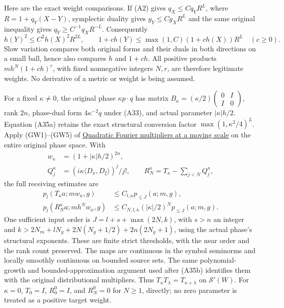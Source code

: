 \documentclass[
  11pt,
]{article}
\begin{document}
Here are the exact weight comparisons. If (A2) gives \(q_X\le Cq_YR^L\),
where \(R=1+q_Y(X-Y)\), symplectic duality gives \(g_Y\le Cg_XR^L\) and
the same original inequality gives \(q_Y\ge C^{-1}q_XR^{-L}\).
Consequently \[
h(Y)^2\le C^2h(X)^2R^{2L},\qquad
1+c h(Y)\le\max(1,C)(1+c h(X))R^L\quad(c\ge0).
\tag{AU1}
\] Slow variation compares both original forms and their duals in both
directions on a small ball, hence also compares \(h\) and \(1+ch\). All
positive products \(mh^N(1+ch)^r\), with fixed nonnegative integers
\(N,r\), are therefore legitimate weights. No derivative of a metric or
weight is being assumed.

For a fixed \(\kappa\ne0\), the original phase \(\kappa p\cdot q\) has
matrix
\(B_\kappa=(\kappa/2)\left(\begin{smallmatrix}0&I\\I&0\end{smallmatrix}\right)\),
rank \(2n\), phase-dual form \(4\kappa^{-2}q\) under (A33), and actual
parameter \(|\kappa|h/2\). Equation (A35a) retains the exact structural
conversion factor \(\max(1,\kappa^2/4)^L\). Apply (GW1)--(GW5) of
\href{gauss-transform-estimates.pdf}{Quadratic Fourier multipliers at a
moving scale} on the entire original phase space. With \[
\begin{aligned}
w_\kappa&=(1+|\kappa|h/2)^{2n},\\
Q_j^\kappa&=(i\kappa\langle D_x,D_\xi\rangle)^j/j!,\qquad
R_N^\kappa=T_\kappa-\sum_{j<N}Q_j^\kappa,
\end{aligned}
\tag{AU2}
\] the full receiving estimates are \[
\begin{aligned}
p_l(T_\kappa a;mw_\kappa,g)&\le C_{l,\kappa}p_{\le J}(a;m,g),\\
p_l(R_N^\kappa a;mh^Nw_\kappa,g)
 &\le C_{N,l,\kappa}(|\kappa|/2)^Np_{\le J}(a;m,g).
\end{aligned}
\tag{AU3}
\] One sufficient input order is \(J=l+s+\max(2N,k)\), with \(s>n\) an
integer and \(k>2N_m+lN_g+2N(N_g+1/2)+2n(2N_g+1)\), using the actual
phase's structural exponents. These are finite strict thresholds, with
the near order and the rank count preserved. The maps are continuous in
the symbol seminorms and locally smoothly continuous on bounded source
sets. The same polynomial-growth and bounded-approximation argument used
after (A35b) identifies them with the original distributional
multipliers. Thus \(T_\kappa T_\lambda=T_{\kappa+\lambda}\) on
\(\mathcal S'(W)\). For \(\kappa=0\), \(T_0=I\), \(R_0^0=I\), and
\(R_N^0=0\) for \(N\ge1\), directly; no zero parameter is treated as a
positive target weight.
\end{document}
